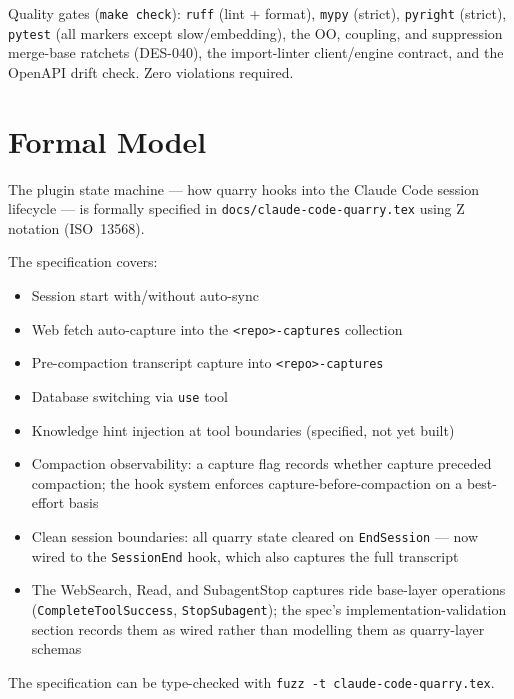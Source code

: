 \documentclass[a4paper,10pt]{article}
\begin{document}
Quality gates (\texttt{make check}): \texttt{ruff} (lint + format),
\texttt{mypy} (strict), \texttt{pyright} (strict), \texttt{pytest} (all
markers except slow/embedding), the OO, coupling, and suppression
merge-base ratchets (DES-040), the import-linter client/engine contract,
and the OpenAPI drift check.  Zero violations required.

\section{Formal Model}

The plugin state machine --- how quarry hooks into the Claude Code
session lifecycle --- is formally specified in
\texttt{docs/claude-code-quarry.tex} using Z notation (ISO~13568).

The specification covers:

\begin{itemize}
  \item Session start with/without auto-sync
  \item Web fetch auto-capture into the \texttt{<repo>-captures} collection
  \item Pre-compaction transcript capture into \texttt{<repo>-captures}
  \item Database switching via \texttt{use} tool
  \item Knowledge hint injection at tool boundaries (specified, not yet
    built)
  \item Compaction observability: a capture flag records whether
    capture preceded compaction; the hook system enforces
    capture-before-compaction on a best-effort basis
  \item Clean session boundaries: all quarry state cleared on
    \texttt{EndSession} --- now wired to the \texttt{SessionEnd} hook,
    which also captures the full transcript
  \item The WebSearch, Read, and SubagentStop captures ride base-layer
    operations (\texttt{CompleteToolSuccess}, \texttt{StopSubagent}); the
    spec's implementation-validation section records them as wired
    rather than modelling them as quarry-layer schemas
\end{itemize}

The specification can be type-checked with \texttt{fuzz -t
claude-code-quarry.tex}.

\appendix
\end{document}
